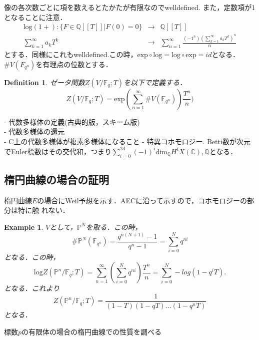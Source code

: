 \documentclass{ujarticle}
\newtheorem{dfn}[thm]{Definition}
\newtheorem{epl}[thm]{Example}
\begin{document}
像の各次数ごとに項を数えるとたかたが有限なのでwelldefined.
また，定数項が1となることに注意．
\begin{eqnarray*}
  \mathrm{log(1 + )}: \{F \in \mathbb{Q}[[T]] | F(0) = 0 \} & \to
  &\mathbb{Q}[[T]] \\
  \sum_{k=1}^{\infty}a_kT^k  & \to &
  \sum_{n=1}^{\infty}\frac{{(-1^n)(\sum_{k=1}^{\infty}a_kT^k) }^n}{n}
\end{eqnarray*}
とする．同様にこれもwelldefined.この時，$ \mathrm{exp} \circ
\mathrm{log}=\mathrm{log} \circ \mathrm{exp} = id$となる．
$ \# V(F_{q^n})$を有理点の位数とする．
\begin{dfn}
  ゼータ関数$Z(V/\mathbb{F}_q;T)$を以下で定義する．
  \begin{equation*}
   Z(V/\mathbb{F}_q;T)=
   \mathrm{exp}(\sum_{n=1}^{\infty}\#V(\mathbb{F}_{q^n}) ) \frac{T^n}{n})
  \end{equation*}
\end{dfn}

- 代数多様体の定義(古典的版，スキーム版)　\\
- 代数多様体の還元 \\
- C上の代数多様体が複素多様体になること
- 特異コホモロジー.
Betti数が次元でEuler標数はその交代和，つまり$\sum_{i=0}^{2d}(-1)^i
\mathrm{dim}_{\mathbb{Q}}H^i{X(\mathbb{C}),\mathbb{Q}}$となる．

\subsection{楕円曲線の場合の証明}
\label{sub:楕円曲線の場合の証明}
楕円曲線$E$の場合にWeil予想を示す．AECに沿って示すので，コホモロジーの部分は特に触
れない．

\begin{epl}
 $V$として，$\mathbb{P}^N$を取る．この時，
 \begin{equation*}
  \# \mathbb{P}^N(\mathbb{F}_{q^n})=\frac{q^{n(N+1)}-1}{q^n-1}=
  \sum_{i=0}^Nq^{ni}
 \end{equation*}
 となる．この時，
 \begin{equation*}
  \mathrm{log}Z(\mathbb{P}^n/\mathbb{F}_q;T)= \sum_{n=1}^{\infty}
  (\sum_{i=0}^Nq^{ni})\frac{T^n}{n} = \sum_{i=0}^N-log(1-q^iT).
\end{equation*}
  となる．これより
\begin{equation*}
  Z(\mathbb{P}^n/\mathbb{F}_q;T)= \frac{1}{(1-T)(1-qT)\dots(1-q^nT)}
\end{equation*}
となる．
\end{epl}
標数$p$の有限体の場合の楕円曲線での性質を調べる
\end{document}
